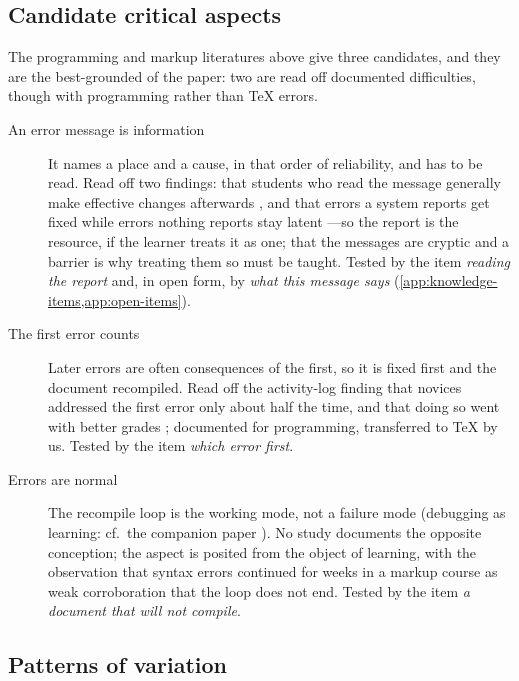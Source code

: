 \subsection{Candidate critical aspects}
\label{sec:errors-aspects}

The programming and markup literatures above give three candidates, and
they are the best-grounded of the paper: two are read off documented
difficulties, though with programming rather than TeX errors.

\begin{description}
  \item[An error message is information]
    It names a place and a cause, in that order of reliability, and has
    to be read.
    Read off two findings: that students who read the message generally
    make effective changes afterwards \autocite{Prather2017Interaction},
    and that errors a system reports get fixed while errors nothing
    reports stay latent \autocite{Park2015SyntaxErrors,%
    Park2013ErrorTaxonomy}---so the report is the resource, if the
    learner treats it as one; that the messages are cryptic and a barrier
    \autocite{Becker2016CEM,Traver2010CompilerErrors,%
    Denny2021ErrorReadability} is why treating them so must be taught.
    Tested by the item \emph{reading the report} and, in open form, by
    \emph{what this message says}
    (\cref{app:knowledge-items,app:open-items}).
  \item[The first error counts]
    Later errors are often consequences of the first, so it is fixed
    first and the document recompiled.
    Read off the activity-log finding that novices addressed the first
    error only about half the time, and that doing so went with better
    grades \autocite{Munson2016CompilerErrors}; documented for
    programming, transferred to TeX by us.
    Tested by the item \emph{which error first}.
  \item[Errors are normal]
    The recompile loop is the working mode, not a failure mode
    (debugging as learning: cf.\ the companion paper
    \autocite{VTDebug}).
    No study documents the opposite conception; the aspect is posited
    from the object of learning, with the observation that syntax errors
    continued for weeks in a markup course \autocite{Park2015SyntaxErrors}
    as weak corroboration that the loop does not end.
    Tested by the item \emph{a document that will not compile}.
\end{description}

\subsection{Patterns of variation}

